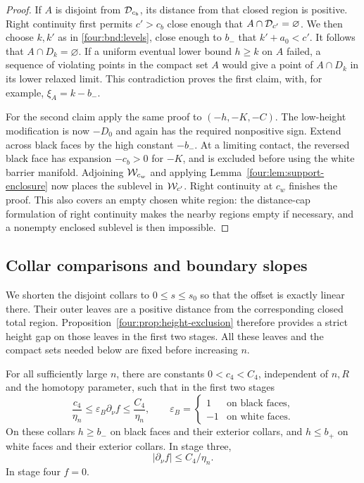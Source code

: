 \begin{proof}
If $A$ is disjoint from $\mathcal D_{c_b}$, its distance from that closed
region is positive.  Right continuity first permits $c'>c_b$ close
enough that $A\cap\mathcal D_{c'}=\varnothing$.  We then choose $k,k'$ as
in \eqref{four:bnd:levels}, close enough to $b_-$ that
$k'+a_0<c'$.  It follows that $A\cap D_k=\varnothing$.  If a uniform
eventual lower bound $h\ge k$ on $A$ failed, a sequence of violating
points in the compact set $A$ would give a point of $A\cap D_k$ in
its lower relaxed limit.  This contradiction proves the first claim,
with, for example, $\xi_A=k-b_-$.

For the second claim apply the same proof to
$(-h,-K,-C)$.  The low-height modification is now $-D_0$ and again
has the required nonpositive sign.  Extend across black faces by
the high constant $-b_-$.  At a limiting contact, the reversed black
face has expansion $-c_b>0$ for $-K$, and is excluded before using
the white barrier manifold.  Adjoining $\mathcal W_{c_w}$ and applying
Lemma~\ref{four:lem:support-enclosure} now places the sublevel in
$\mathcal W_{c'}$.  Right continuity at $c_w$ finishes the proof.  This also
covers an empty chosen white region: the distance-cap formulation
of right continuity makes the nearby regions empty if necessary,
and a nonempty enclosed sublevel is then impossible.
\end{proof}

\subsection{Collar comparisons and boundary slopes}

We shorten the disjoint collars to $0\le s\le s_0$ so that the offset
is exactly linear there.  Their outer leaves are a positive distance
from the corresponding closed total region.  Proposition~\ref{four:prop:height-exclusion}
therefore provides a strict height gap on those leaves in the first
two stages.  All these leaves and the compact sets needed below are
fixed before increasing $n$.

\begin{lemma}\label{four:bnd:collar-slopes}
For all sufficiently large $n$, there are constants $0<c_4<C_4$,
independent of $n,R$ and the homotopy parameter, such that in the
first two stages
\begin{equation}\label{four:bnd:signed-slopes}
 \frac{c_4}{\eta_n}\le\varepsilon_B\partial_\nu f
 \le\frac{C_4}{\eta_n},\qquad
 \varepsilon_B=\begin{cases}1&\text{on black faces},\\-1&\text{on white faces}.
 \end{cases}
\end{equation}
On these collars $h\ge b_-$ on black faces and their exterior
collars, and $h\le b_+$ on white faces and their exterior collars.
In stage three,
\begin{equation}\label{four:bnd:third-slopes}
 |\partial_\nu f|\le C_4/\eta_n.
\end{equation}
In stage four $f=0$.
\end{lemma}

